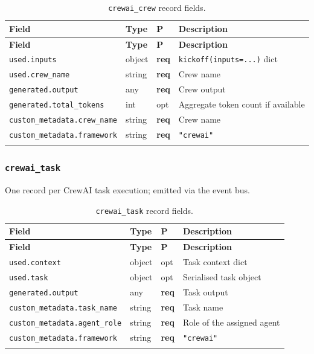 \documentclass[11pt,a4paper]{article}
\newcommand{\opt}{\textcolor{optred}{opt}}
\newcommand{\req}{\textbf{req}}
\newcommand{\subtype}[1]{\texttt{\textcolor{subtypeblue}{#1}}}
\begin{document}
\begin{longtable}{L{4cm} L{2.5cm} C{1.2cm} L{6.5cm}}
\toprule
\textbf{Field} & \textbf{Type} & \textbf{P} & \textbf{Description} \\
\midrule
\endfirsthead
\toprule \textbf{Field} & \textbf{Type} & \textbf{P} & \textbf{Description} \\
\midrule
\endhead
\bottomrule
\endlastfoot

\texttt{used.inputs}                & object & \req & \texttt{kickoff(inputs=...)} dict \\
\texttt{used.crew\_name}            & string & \req & Crew name \\
\texttt{generated.output}           & any    & \req & Crew output \\
\texttt{generated.total\_tokens}    & int    & \opt & Aggregate token count if available \\
\texttt{custom\_metadata.crew\_name}& string & \req & Crew name \\
\texttt{custom\_metadata.framework} & string & \req & \texttt{"crewai"} \\

\caption{\subtype{crewai\_crew} record fields.}
\end{longtable}

\subsubsection{\subtype{crewai\_task}}

One record per CrewAI task execution; emitted via the event bus.

\begin{longtable}{L{4cm} L{2.5cm} C{1.2cm} L{6.5cm}}
\toprule
\textbf{Field} & \textbf{Type} & \textbf{P} & \textbf{Description} \\
\midrule
\endfirsthead
\toprule \textbf{Field} & \textbf{Type} & \textbf{P} & \textbf{Description} \\
\midrule
\endhead
\bottomrule
\endlastfoot

\texttt{used.context}               & object & \opt & Task context dict \\
\texttt{used.task}                  & object & \opt & Serialised task object \\
\texttt{generated.output}           & any    & \req & Task output \\
\texttt{custom\_metadata.task\_name}& string & \req & Task name \\
\texttt{custom\_metadata.agent\_role}& string & \req & Role of the assigned agent \\
\texttt{custom\_metadata.framework} & string & \req & \texttt{"crewai"} \\

\caption{\subtype{crewai\_task} record fields.}
\end{longtable}
\end{document}
